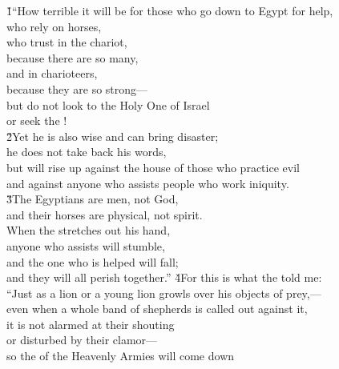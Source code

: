 \begin{poetry}
\poeml {}
\v{1}``How terrible it will be for those who go down to Egypt for help, \\
\poemll    who rely on horses, \\
\poeml who trust in the chariot, \\
\poemll    because there are so many, \\
\poeml and in charioteers, \\
\poemll    because they are so strong--- \\
\poeml but do not look to the Holy One of Israel \\
\poemll    or seek the ! \\
\poeml \v{2}Yet he is also wise and can bring disaster; \\
\poemll    he does not take back his words, \\
\poeml but will rise up against the house of those who practice evil \\
\poemll    and against anyone who assists people who work iniquity. \\
\poeml \v{3}The Egyptians are men, not God, \\
\poemll    and their horses are physical, not spirit. \\
\poeml When the  stretches out his hand, \\
\poemll    anyone who assists will stumble, \\
\poeml and the one who is helped will fall; \\
\poemll    and they will all perish together.''
\poeml \v{4}For this is what the  told me: \\
\poeml ``Just as a lion or a young lion growls over his objects of prey,--- \\
\poemll    even when a whole band of shepherds is called out against it, \\
\poeml it is not alarmed at their shouting \\
\poemll    or disturbed by their clamor--- \\
\poeml so the  of the Heavenly Armies will come down \\

\end{poetry}

